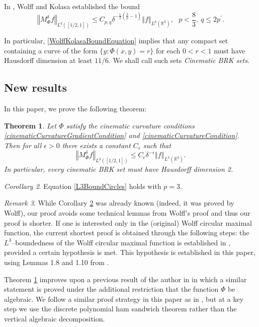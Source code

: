 \documentclass[reqno]{amsart}
\newtheorem{thm}{Theorem}
\theoremstyle{definition}
\theoremstyle{remark}
\newtheorem{rem}[thm]{Remark}
\newtheorem{cor}[thm]{Corollary}
\theoremstyle{remark}
\newcommand{\norm}[1]{\left\Vert#1\right\Vert}
\newcommand{\RR}{\mathbb{R}}
\begin{document}
In \cite{Wolff3}, Wolff and Kolasa established the bound
\begin{equation}\label{WolffKolasaBoundEquation}
\norm{M_\Phi^\delta f}_{L^q([1/2,1])}\leq
C_{p,q}\delta^{-\frac{1}{2}(\frac{3}{p}-1)}\norm{f}_{L^p(\RR^2)},\ \ \
p<\frac{8}{3},\ q\leq 2p^\prime.
\end{equation}

In particular, \eqref{WolffKolasaBoundEquation} implies that any compact set containing a curve of the form $\{y\colon\Phi(x,y)=r\}$ for each $0<r<1$ must have Hausdorff dimension at least $11/6$. We shall call such sets \emph{Cinematic BRK sets}.

\subsection{New results}
In this paper, we prove the following theorem:
\begin{thm}\label{mainThm}
Let $\Phi$ satisfy the cinematic curvature conditions \eqref{cinematicCurvatureGradientCondition} and \eqref{cinematicCurvatureCondition}. Then for all $\epsilon>0$ there exists a constant $C_\epsilon$ such that
\begin{equation}
\norm{M_\Phi^\delta f}_{L^3([1/2,1])}\leq C_\epsilon\delta^{-\epsilon}\norm{f}_{L^3(\RR^2)}.
\end{equation}
In particular, every cinematic BRK set must have Hausdorff dimension 2.
\end{thm}

\begin{cor}\label{CircularMaxmlFnBdCor}
Equation \eqref{L3BoundCircles} holds with $p=3$.
\end{cor}

\begin{rem}
 While Corollary \ref{CircularMaxmlFnBdCor} was already known (indeed, it was proved by Wolff), our proof avoids some technical lemmas from Wolff's proof and thus our proof is shorter. If one is interested only in the (original) Wolff circular maximal function, the current shortest proof is obtained through the following steps: the $L^3$--boundedness of the Wolff circular maximal function is established in \cite[\S4]{Schlag}, provided a certain hypothesis is met. This hypothesis is established in this paper, using Lemmas 1.8 and 1.10 from \cite{Wolff4}.
\end{rem}

Theorem \ref{mainThm} improves upon a previous result of the author in \cite{Zahl} in which a similar statement is proved under the additional restriction that the function $\Phi$ be algebraic. We follow a similar proof strategy in this paper as in \cite{Zahl}, but at a key step we use the discrete polynomial ham sandwich theorem rather than the vertical algebraic decomposition.
\end{document}
